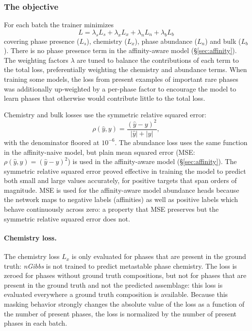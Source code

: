 \subsubsection{The objective}

For each batch the trainer minimizes
\begin{equation}
  L = \lambda_s L_s + \lambda_x L_x + \lambda_n L_n + \lambda_b L_b
\label{eq:total}
\end{equation}
covering phase presence ($L_s$), chemistry ($L_x$), phase abundance ($L_n$) and bulk
($L_b$). There is no phase presence term in the affinity-aware model (\S\ref{sec:affinity}). 
The weighting factors $\lambda$ are tuned to balance the contributions of each term to the total loss, 
preferentially weighting the chemistry and abundance terms. When training some models, the loss from present 
examples of important rare phases was additionally up-weighted by a per-phase factor to encourage the model
to learn phases that otherwise would contribute little to the total loss.

Chemistry and bulk losses use the symmetric relative squared error:
\begin{equation}
  \rho(\hat y, y) = \frac{(\hat y - y)^2}{|\hat y| + |y|},
  \label{eq:rho}
\end{equation}
with the denominator floored at $10^{-6}$. 
The abundance loss uses the same function in the affinity-naive model, 
but plain mean squared error (MSE: $\rho(\hat y, y) = (\hat y - y)^2$) is used in the affinity-aware model (\S\ref{sec:affinity}).
The symmetric relative squared error proved effective in training the model to predict both small and large values accurately, 
for positive targets that span orders of magnitude. MSE is used for the affinity-aware model abundance heads because the network maps
to negative labels (affinities) as well as positive labels which behave continuously across zero: a property that 
MSE preserves but the symmetric relative squared error does not.

\paragraph{Chemistry loss.} The chemistry loss $L_x$ is only evaluated for phases that are present in the ground truth: \emph{nGibbs}
is not trained to predict metastable phase chemistry. The loss is zeroed for phases without ground truth compositions, 
but not for phases that are present in the ground truth and not the predicted assemblage: this loss is evaluated 
everywhere a ground truth composition is available. Because this masking behavior strongly changes the absolute value of 
the loss as a function of the number of present phases, the loss is normalized by the number of present phases in each batch.

